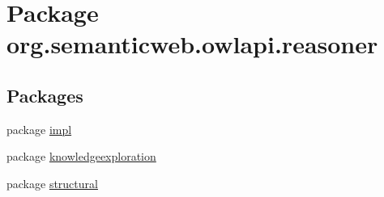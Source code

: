 \hypertarget{namespaceorg_1_1semanticweb_1_1owlapi_1_1reasoner}{\section{Package org.\-semanticweb.\-owlapi.\-reasoner}
\label{namespaceorg_1_1semanticweb_1_1owlapi_1_1reasoner}
}
\subsection*{Packages}
\begin{DoxyCompactItemize}
\item 
package \hyperlink{namespaceorg_1_1semanticweb_1_1owlapi_1_1reasoner_1_1impl}{impl}
\item 
package \hyperlink{namespaceorg_1_1semanticweb_1_1owlapi_1_1reasoner_1_1knowledgeexploration}{knowledgeexploration}
\item 
package \hyperlink{namespaceorg_1_1semanticweb_1_1owlapi_1_1reasoner_1_1structural}{structural}
\end{DoxyCompactItemize}
